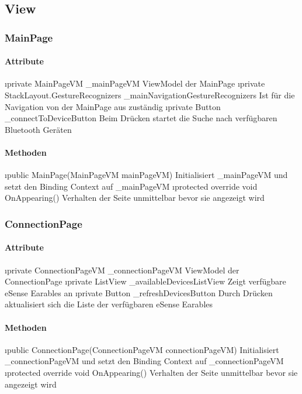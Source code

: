 \documentclass[../entwurf.tex]{subfiles}
\begin{document}
\subsection{View}
\subsubsection{MainPage}

\paragraph{Attribute}

\begin{itemize}
	\i{private MainPageVM \_mainPageVM} ViewModel der MainPage
	\i{private StackLayout.GestureRecognizers \_mainNavigationGestureRecognizers} Ist für die Navigation von der MainPage aus zuständig
	\i{private Button \_connectToDeviceButton} Beim Drücken startet die Suche nach verfügbaren Bluetooth Geräten
\end{itemize}
\paragraph{Methoden}
\begin{itemize}
	\i{public MainPage(MainPageVM mainPageVM)} Initialisiert \_mainPageVM und setzt den Binding Context 			auf \_mainPageVM
	\i{protected override void OnAppearing()} Verhalten der Seite unmittelbar bevor sie angezeigt wird
\end{itemize}

\subsubsection{ConnectionPage}

\paragraph{Attribute}
\begin{itemize}
	\i{private ConnectionPageVM \_connectionPageVM} ViewModel der ConnectionPage
	\i{private ListView \_availableDevicesListView} Zeigt verfügbare eSense Earables an
	\i{private Button \_refreshDevicesButton} Durch Drücken aktualisiert sich die Liste der verfügbaren eSense Earables
\end{itemize}

\paragraph{Methoden}
\begin{itemize}
	\i{public ConnectionPage(ConnectionPageVM connectionPageVM)} Initialisiert \_connectionPageVM und setzt den Binding Context 			auf \_connectionPageVM
	\i{protected override void OnAppearing()} Verhalten der Seite unmittelbar bevor sie angezeigt wird
\end{itemize}
\end{document}

